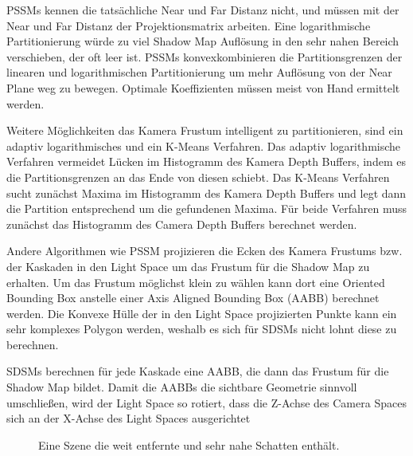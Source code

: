 \documentclass[runningheaders,a4paper]{llncs}
\begin{document}
PSSMs kennen die tatsächliche Near und Far Distanz nicht, und müssen mit der Near und Far Distanz der Projektionsmatrix arbeiten.
Eine logarithmische Partitionierung würde zu viel Shadow Map Auflösung in den sehr nahen Bereich verschieben, der oft leer ist.
PSSMs konvexkombinieren die Partitionsgrenzen der linearen und logarithmischen Partitionierung um mehr Auflösung von der Near Plane weg zu bewegen.
Optimale Koeffizienten müssen meist von Hand ermittelt werden.

Weitere Möglichkeiten das Kamera Frustum intelligent zu partitionieren, sind ein adaptiv logarithmisches und ein K-Means Verfahren.
Das adaptiv logarithmische Verfahren vermeidet Lücken im Histogramm des Kamera Depth Buffers, indem es die Partitionsgrenzen an das Ende von diesen schiebt.
Das K-Means Verfahren sucht zunächst Maxima im Histogramm des Kamera Depth Buffers und legt dann die Partition entsprechend um die gefundenen Maxima.
Für beide Verfahren muss zunächst das Histogramm des Camera Depth Buffers berechnet werden.


Andere Algorithmen wie PSSM \cite{pssm} projizieren die Ecken des Kamera Frustums bzw. der Kaskaden in den Light Space um das Frustum für die Shadow Map zu erhalten.
Um das Frustum möglichst klein zu wählen kann dort eine Oriented Bounding Box anstelle einer Axis Aligned Bounding Box (AABB) berechnet werden.
Die Konvexe Hülle der in den Light Space projizierten Punkte kann ein sehr komplexes Polygon werden, weshalb es sich für SDSMs nicht lohnt diese zu berechnen.

SDSMs berechnen für jede Kaskade eine AABB, die dann das Frustum für die Shadow Map bildet.
Damit die AABBs die sichtbare Geometrie sinnvoll umschließen, wird der Light Space so rotiert, dass die Z-Achse des Camera Spaces sich an der X-Achse des Light Spaces ausgerichtet


\begin{figure}
	\centering
	\caption{Eine Szene die weit entfernte und sehr nahe Schatten enthält.}
\end{figure}
\end{document}
